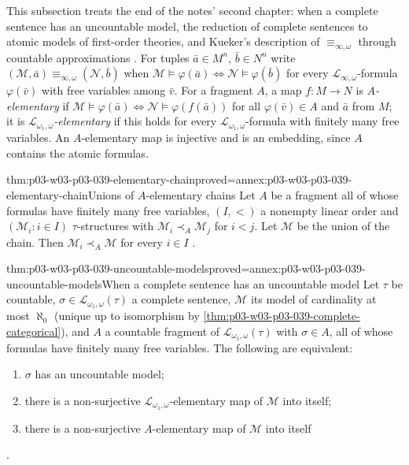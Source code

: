 This subsection treats the end of the notes' second chapter: when a complete
sentence has an uncountable model, the reduction of complete sentences to
atomic models of first-order theories, and Kueker's description of
\(\equiv_{\infty,\omega}\) through countable approximations
\cite[pp.~21--26]{Marker2014InfinitaryNotes}. For tuples
\(\bar a\in M^n\), \(\bar b\in N^n\) write
\((\mathcal M,\bar a)\equiv_{\infty,\omega}(\mathcal N,\bar b)\) when
\(\mathcal M\models\varphi(\bar a)\Leftrightarrow\mathcal N\models\varphi(\bar b)\)
for every \(\mathcal L_{\infty,\omega}\)-formula \(\varphi(\bar v)\) with free
variables among \(\bar v\). For a fragment \(A\), a map
\(f:M\to N\) is \emph{\(A\)-elementary} if
\(\mathcal M\models\varphi(\bar a)\Leftrightarrow\mathcal N\models\varphi(f(\bar a))\)
for all \(\varphi(\bar v)\in A\) and \(\bar a\) from \(M\); it is
\emph{\(\mathcal L_{\omega_1,\omega}\)-elementary} if this holds for every
\(\mathcal L_{\omega_1,\omega}\)-formula with finitely many free variables.
An \(A\)-elementary map is injective and is an embedding, since \(A\)
contains the atomic formulas.

\begin{hblemma}{thm:p03-w03-p03-039-elementary-chain}{proved=annex:p03-w03-p03-039-elementary-chain}{Unions of \(A\)-elementary chains}
Let \(A\) be a fragment all of whose formulas have finitely many free
variables, \((I,<)\) a nonempty linear order and \((\mathcal M_i:i\in I)\)
\(\tau\)-structures with \(\mathcal M_i\prec_A\mathcal M_j\) for \(i<j\). Let
\(\mathcal M\) be the union of the chain. Then
\(\mathcal M_i\prec_A\mathcal M\) for every \(i\in I\)
\cite[Ex.~1.28, p.~11]{Marker2014InfinitaryNotes}.
\end{hblemma}

\begin{hbtheorem}{thm:p03-w03-p03-039-uncountable-models}{proved=annex:p03-w03-p03-039-uncountable-models}{When a complete sentence has an uncountable model}
Let \(\tau\) be countable, \(\sigma\in\mathcal L_{\omega_1,\omega}(\tau)\) a
complete sentence, \(\mathcal M\) its model of cardinality at most
\(\aleph_0\) (unique up to isomorphism by
\cref{thm:p03-w03-p03-039-complete-categorical}), and \(A\) a countable
fragment of \(\mathcal L_{\omega_1,\omega}(\tau)\) with \(\sigma\in A\), all
of whose formulas have finitely many free variables. The following are
equivalent:
\begin{enumerate}
\item \(\sigma\) has an uncountable model;
\item there is a non-surjective \(\mathcal L_{\omega_1,\omega}\)-elementary
      map of \(\mathcal M\) into itself;
\item there is a non-surjective \(A\)-elementary map of \(\mathcal M\) into
      itself
\end{enumerate}
\cite[Ex.~2.31, p.~21]{Marker2014InfinitaryNotes}.
\end{hbtheorem}

